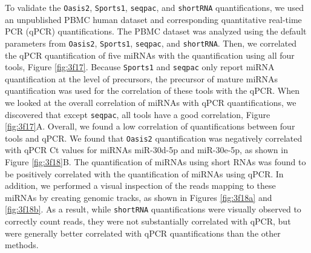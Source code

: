 \documentclass[12pt,twoside]{reedthesis}
\begin{document}
To validate the \texttt{Oasis2}, \texttt{Sports1}, \texttt{seqpac}, and \texttt{shortRNA} quantifications,
we used an unpublished PBMC human dataset and corresponding quantitative
real-time PCR (qPCR) quantifications. The PBMC dataset was analyzed
using the default parameters from \texttt{Oasis2}, \texttt{Sports1}, \texttt{seqpac}, and \texttt{shortRNA}.
Then, we correlated the qPCR quantification of five miRNAs with the
quantification using all four tools, Figure \ref{fig:3f17}. Because \texttt{Sports1} and
\texttt{seqpac} only report miRNA quantification at the level of precursors, the
precursor of mature miRNAs quantification was used for the correlation
of these tools with the qPCR. When we looked at the overall correlation
of miRNAs with qPCR quantifications, we discovered that except \texttt{seqpac}, all tools have a good correlation, Figure \ref{fig:3f17}A. Overall, we found a low correlation of
quantifications between four tools and qPCR. We found that \texttt{Oasis2}
quantification was negatively correlated with qPCR Ct values for miRNAs
miR-30d-5p and miR-30e-5p, as shown in Figure \ref{fig:3f18}B. The quantification of
miRNAs using short RNAs was found to be positively correlated with the
quantification of miRNAs using qPCR. In addition, we performed a visual
inspection of the reads mapping to these miRNAs by creating genomic
tracks, as shown in Figures \ref{fig:3f18a} and \ref{fig:3f18b}. As a result, while \texttt{shortRNA}
quantifications were visually observed to correctly count reads, they
were not substantially correlated with qPCR, but were generally better
correlated with qPCR quantifications than the other methods.
\end{document}
